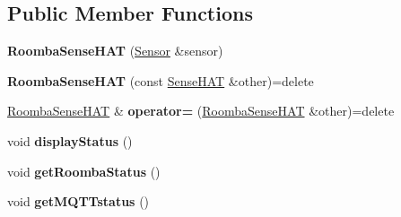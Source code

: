\subsection*{Public Member Functions}
\begin{DoxyCompactItemize}
\item 
{\bfseries Roomba\+Sense\+H\+AT} (\hyperlink{class_sensor}{Sensor} \&sensor)\hypertarget{class_roomba_sense_h_a_t_a72dcec927c5b2274a39789e0274cc0fd}{}\label{class_roomba_sense_h_a_t_a72dcec927c5b2274a39789e0274cc0fd}

\item 
{\bfseries Roomba\+Sense\+H\+AT} (const \hyperlink{class_sense_h_a_t}{Sense\+H\+AT} \&other)=delete\hypertarget{class_roomba_sense_h_a_t_a51bc74e91051739c83f3b79e574f8b58}{}\label{class_roomba_sense_h_a_t_a51bc74e91051739c83f3b79e574f8b58}

\item 
\hyperlink{class_roomba_sense_h_a_t}{Roomba\+Sense\+H\+AT} \& {\bfseries operator=} (\hyperlink{class_roomba_sense_h_a_t}{Roomba\+Sense\+H\+AT} \&other)=delete\hypertarget{class_roomba_sense_h_a_t_a55718c0f738b82c383083ece3b026930}{}\label{class_roomba_sense_h_a_t_a55718c0f738b82c383083ece3b026930}

\item 
void {\bfseries display\+Status} ()\hypertarget{class_roomba_sense_h_a_t_ad818e7105b0e47a88f93963edea85474}{}\label{class_roomba_sense_h_a_t_ad818e7105b0e47a88f93963edea85474}

\item 
void {\bfseries get\+Roomba\+Status} ()\hypertarget{class_roomba_sense_h_a_t_abadc74cb7f41e91ed7884bd3568ddb86}{}\label{class_roomba_sense_h_a_t_abadc74cb7f41e91ed7884bd3568ddb86}

\item 
void {\bfseries get\+M\+Q\+T\+Tstatus} ()\hypertarget{class_roomba_sense_h_a_t_a2b5e58a1b75b3e7008e3f21aa890f54a}{}\label{class_roomba_sense_h_a_t_a2b5e58a1b75b3e7008e3f21aa890f54a}

\end{DoxyCompactItemize}
